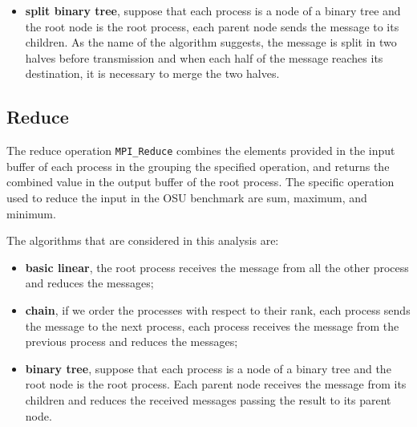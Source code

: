 \begin{itemize}
    \item \textbf{split binary tree}, suppose that each process is a node of a binary tree and the root node is the root process, each parent node sends the message to its children. As the name of the algorithm suggests, the message is split in two halves before transmission and when each half of the message reaches its destination, it is necessary to merge the two halves.
    \begin{center}
    \end{center}

\end{itemize}


\subsection{Reduce}

The reduce operation \texttt{MPI\_Reduce} combines the elements provided in the input buffer of each process in the grouping the specified operation, and returns the combined value in the output buffer of the root process. The specific operation used to reduce the input in the OSU benchmark are sum, maximum, and minimum.

The algorithms that are considered in this analysis are:
\begin{itemize}
    \item \textbf{basic linear}, the root process receives the message from all the other process and reduces the messages;
    \item \textbf{chain}, if we order the processes with respect to their rank, each process sends the message to the next process, each process receives the message from the previous process and reduces the messages;
    \item \textbf{binary tree}, suppose that each process is a node of a binary tree and the root node is the root process. Each parent node receives the message from its children and reduces the received messages passing the result to its parent node.
\end{itemize}